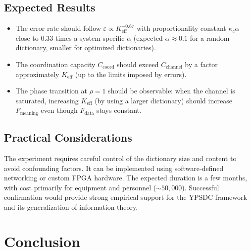 \documentclass[12pt,a4paper]{article}
\theoremstyle{remark}
\newcommand{\Keff}{K_{\mathrm{eff}}}
\begin{document}
	\subsection{Expected Results}
	
	\begin{itemize}
		\item The error rate should follow $\varepsilon \propto \Keff^{-0.67}$ with proportionality constant $\kappa_c \alpha$ close to $0.33$ times a system‑specific $\alpha$ (expected $\alpha \approx 0.1$ for a random dictionary, smaller for optimized dictionaries).
		\item The coordination capacity $C_{\text{coord}}$ should exceed $C_{\text{channel}}$ by a factor approximately $\Keff$ (up to the limits imposed by errors).
		\item The phase transition at $\rho=1$ should be observable: when the channel is saturated, increasing $\Keff$ (by using a larger dictionary) should increase $F_{\text{meaning}}$ even though $F_{\text{data}}$ stays constant.
	\end{itemize}
	
	\subsection{Practical Considerations}
	
	The experiment requires careful control of the dictionary size and content to avoid confounding factors. It can be implemented using software‑defined networking or custom FPGA hardware. The expected duration is a few months, with cost primarily for equipment and personnel ($\sim 50,000$). Successful confirmation would provide strong empirical support for the YPSDC framework and its generalization of information theory.
	
	\section{Conclusion}
	
\end{document}
